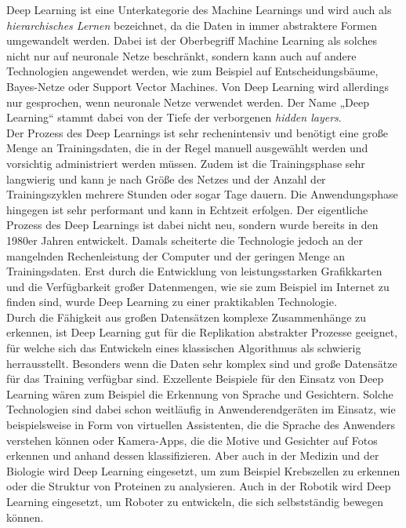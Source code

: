 \newpage

\noindent Deep Learning ist eine Unterkategorie des Machine Learnings und wird auch als \textit{hierarchisches Lernen} bezeichnet, da die Daten in immer abstraktere Formen umgewandelt werden. Dabei ist der Oberbegriff Machine Learning als solches nicht nur auf neuronale Netze beschränkt, sondern kann auch auf andere Technologien angewendet werden, wie zum Beispiel auf Entscheidungsbäume, Bayes-Netze oder Support Vector Machines. Von Deep Learning wird allerdings nur gesprochen, wenn neuronale Netze verwendet werden. Der Name „Deep Learning“ stammt dabei von der Tiefe der verborgenen \textit{hidden layers}.\\

\noindent Der Prozess des Deep Learnings ist sehr rechenintensiv und benötigt eine große Menge an Trainingsdaten, die in der Regel manuell ausgewählt werden und vorsichtig administriert werden müssen. Zudem ist die Trainingsphase sehr langwierig und kann je nach Größe des Netzes und der Anzahl der Trainingszyklen mehrere Stunden oder sogar Tage dauern. Die Anwendungsphase hingegen ist sehr performant und kann in Echtzeit erfolgen. Der eigentliche Prozess des Deep Learnings ist dabei nicht neu, sondern wurde bereits in den 1980er Jahren entwickelt. Damals scheiterte die Technologie jedoch an der mangelnden Rechenleistung der Computer und der geringen Menge an Trainingsdaten. Erst durch die Entwicklung von leistungsstarken Grafikkarten und die Verfügbarkeit großer Datenmengen, wie sie zum Beispiel im Internet zu finden sind, wurde Deep Learning zu einer praktikablen Technologie. \\

\noindent Durch die Fähigkeit aus großen Datensätzen komplexe Zusammenhänge zu erkennen, ist Deep Learning gut für die Replikation abstrakter Prozesse geeignet, für welche sich das Entwickeln eines klassischen Algorithmus als schwierig herrausstellt. Besonders wenn die Daten sehr komplex sind und große Datensätze für das Training verfügbar sind. Exzellente Beispiele für den Einsatz von Deep Learning wären zum Beispiel die Erkennung von Sprache und Gesichtern. Solche Technologien sind dabei schon weitläufig in Anwenderendgeräten im Einsatz, wie beispielsweise in Form von virtuellen Assistenten, die die Sprache des Anwenders verstehen können oder Kamera-Apps, die die Motive und Gesichter auf Fotos erkennen und anhand dessen klassifizieren. Aber auch in der Medizin und der Biologie wird Deep Learning eingesetzt, um zum Beispiel Krebszellen zu erkennen oder die Struktur von Proteinen zu analysieren. Auch in der Robotik wird Deep Learning eingesetzt, um Roboter zu entwickeln, die sich selbstständig bewegen können. \\

\newpage